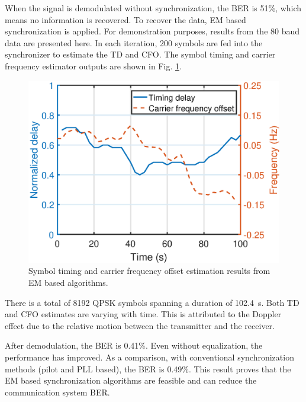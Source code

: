 \documentclass[journal,comsoc, onecolumn, 12pt,draftclsnofoot]{IEEEtran} %
\begin{document}
When the signal is demodulated without synchronization, the BER is 51\%, which means no information is recovered.
To recover the data, EM based synchronization is applied.
For demonstration purposes, results from the 80 baud data are presented here.
In each iteration, 200 symbols are fed into the synchronizer to estimate the TD and CFO. 
The symbol timing and carrier frequency estimator outputs are shown in Fig. \ref{fig:per_exp}.

\begin{figure}[ht]
\centering
\includegraphics[width=3 in]{pic/per_exp.eps}
\caption{Symbol timing and carrier frequency offset estimation results from EM based algorithms.}
\label{fig:per_exp} 
\end{figure} 

There is a total of 8192 QPSK symbols spanning a duration of 102.4~s.
Both TD and CFO estimates are varying with time.
This is attributed to the Doppler effect due to the relative motion between the transmitter and the receiver.

After demodulation, the BER is 0.41\%. Even without equalization, the performance has improved. 
As a comparison, with conventional synchronization methods (pilot and PLL based), the BER is 0.49\%.
This result proves that the EM based synchronization algorithms are feasible and can reduce the communication system BER.
\end{document}
